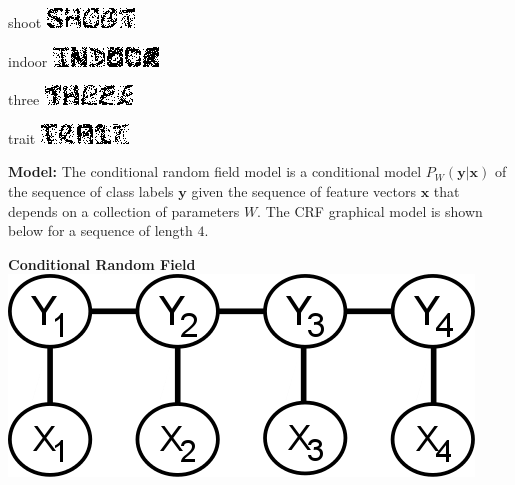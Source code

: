 \documentclass[11pt]{article}
\newcommand{\mbf}[1]{{\mathbf{#1}}} \newcommand{\eq}{\!=\!}
\begin{document}
\begin{center}
  \begin{minipage}[t]{1.4in}\centering
    shoot
    \includegraphics[scale=1]{images/train_img1.png}
  \end{minipage}
  \hspace{1em}
  \begin{minipage}[t]{1.4in}\centering
    indoor
    \includegraphics[scale=1]{images/train_img2.png}
  \end{minipage}
  \hspace{1em}
  \begin{minipage}[t]{1.4in}\centering
    three
    \includegraphics[scale=1]{images/train_img3.png}
  \end{minipage}
  \hspace{1em}
  \begin{minipage}[t]{1.4in}\centering
    trait
    \includegraphics[scale=1]{images/train_img4.png}
  \end{minipage}
\end{center}



\textbf{Model:} The conditional random field model is a conditional model
$P_W(\mbf{y}|\mbf{x})$ of the sequence of class labels $\mbf{y}$ given
the sequence of feature vectors $\mbf{x}$ that depends on a collection of
parameters $W$. The CRF graphical model is shown below for a sequence of length
$4$.\\

\begin{center}
    \centering
    \textbf{Conditional Random Field}\\\vspace{10pt}
    \includegraphics[scale=0.4]{images/crf.png}
\end{center}
\end{document}
